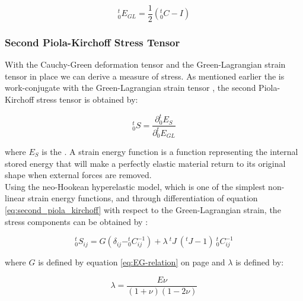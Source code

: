 \begin{equation}
\label{eq:green_lagrange_strain_tensor}
^t_0E_{GL} = \frac{1}{2}( ^t_0C - I)
\end{equation}


\subsubsection*{Second Piola-Kirchoff Stress Tensor}
\label{sec:second_piola_kirchoff_stress_tensor}
With the Cauchy-Green deformation tensor and the Green-Lagrangian
strain tensor in place we can derive a measure of stress. 
As mentioned earlier the  is
work-conjugate with the Green-Lagrangian strain tensor
, the second Piola-Kirchoff stress
tensor is obtained by: 

\begin{equation}
\label{eq:second_piola_kirchoff}
^t_0S = \frac{\partial ^t_0E_S}{\partial ^t_0E_{GL}}
\end{equation}

where $E_S$ is the .
A strain energy function is a function representing the internal
stored energy that will make a perfectly elastic material return to
its original shape when external forces are removed. \\

Using the neo-Hookean hyperelastic model, which is one of the simplest
non-linear strain energy functions, and through differentiation of equation 
\eqref{eq:second_piola_kirchoff} with respect to the Green-Lagrangian
strain, the stress components can be obtained by
:

\begin{equation}
\label{eq:second_piola_kirchoff_tensor}
^t_0S_{ij} = G (\delta_{ij} - ^t_0C_{ij}^{-1}) + \lambda \ ^tJ \ (^tJ-1) \ ^t_0C_{ij}^{-1}
\end{equation}

where $G$ is defined by equation \eqref{eq:EG-relation} on page
\pageref{eq:EG-relation} and $\lambda$ is defined by:

\begin{equation}
\lambda = \frac{E\nu}{(1+\nu)(1-2\nu)}
\end{equation}

